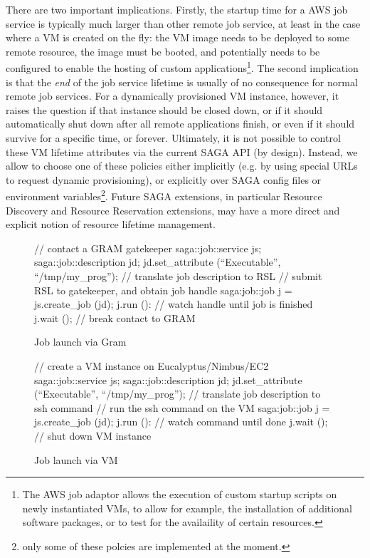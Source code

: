 \documentclass[conference,final]{IEEEtran}
\newcommand{\upp}{\vspace*{-0.5em}}
\newcommand{\I}[1]{\textit{#1}}
\begin{document}
There are two important implications.  Firstly, the startup time for a
AWS job service is typically much larger than other remote job
service, at least in the case where a VM is created on the fly: the VM
image needs to be deployed to some remote resource, the image must be
booted, and potentially needs to be configured to enable the hosting
of custom applications\footnote{The AWS job adaptor allows the
  execution of custom startup scripts on newly instantiated VMs, to
  allow for example, the installation of additional software packages,
  or to test for the availaility of certain resources.}.
The second implication is that the \I{end} of the job service lifetime
is usually of no consequence for normal remote job services.  For a
dynamically provisioned VM instance, however, it raises the question
if that instance should be closed down, or if it should automatically
shut down after all remote applications finish, or even if it should
survive for a specific time, or forever.  Ultimately, it is not
possible to control these VM lifetime attributes via the current SAGA
API (by design).  Instead, we allow to choose one of these policies
either implicitly (e.g. by using special URLs to request dynamic
provisioning), or explicitly over SAGA config files or environment
variables\footnote{only some of these polcies are implemented at the
  moment.}.  Future SAGA extensions, in particular Resource Discovery
and Resource Reservation extensions, may have a more direct and
explicit notion of resource lifetime management.

\begin{figure}[!ht]
\upp 
 \begin{center}
  \begin{mycode}[label=SAGA Job Launch via GRAM gatekeeper]
  { // contact a GRAM gatekeeper
    saga::job::service     js;
    saga::job::description jd;
    jd.set_attribute (``Executable'', ``/tmp/my_prog'');
    // translate job description to RSL
    // submit RSL to gatekeeper, and obtain job handle
    saga:job::job j = js.create_job (jd);
    j.run ():
    // watch handle until job is finished
    j.wait ();
   } // break contact to GRAM
  \end{mycode}
  \caption{\label{gramjob}Job launch via Gram }
 \end{center}
\upp
\end{figure}

\begin{figure}[!ht]
\upp
 \begin{center}
  \begin{mycode}[label=SAGA create a VM instance on a Cloud]
   {// create a VM instance on Eucalyptus/Nimbus/EC2
    saga::job::service     js;
    saga::job::description jd;
    jd.set_attribute (``Executable'', ``/tmp/my_prog'');
    // translate job description to ssh command
    // run the ssh command on the VM
    saga:job::job j = js.create_job (jd);
    j.run ():
    // watch command until done
    j.wait ();
   } // shut down VM instance
  \end{mycode}
  \caption{\label{vmjob} Job launch via VM}
 \end{center}
\upp
\end{figure}
\end{document}
